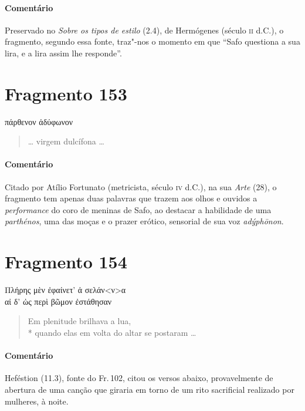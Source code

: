 {\paragraph{Comentário} Preservado no \textit{Sobre os tipos de estilo} (2.4), de Hermógenes (século \textsc{ii} d.C.),
o fragmento, segundo essa fonte, traz"-nos o momento em que ``Safo
questiona a sua lira, e a lira assim lhe responde”.}


\section{Fragmento 153}

\begin{gkverse}
πάρθενον ἀδύφωνον
\end{gkverse}

\begin{verse}
\ldots{} virgem dulcífona \ldots{}
\end{verse}

{\paragraph{Comentário} Citado por Atílio Fortunato (metricista, século \textsc{iv} d.C.), na sua \textit{Arte} (28), o fragmento tem apenas duas palavras que trazem aos olhos e ouvidos a \textit{performance} do coro de meninas de Safo, ao destacar a habilidade de uma \textit{parthénos}, uma das moças e o prazer erótico, sensorial de sua voz \textit{adýphōnon}.}



\section{Fragmento 154}

\begin{gkverse}
Πλήρης μὲν ἐφαίνετ’ ἀ σελάν<ν>α\\
αἰ δ’ ὠς περὶ βῶμον ἐστάθησαν
\end{gkverse}

\begin{verse}
Em plenitude brilhava a lua, \\*
quando elas em volta do altar se postaram \ldots{}
\end{verse}

{\paragraph{Comentário} Heféstion (11.3), fonte do Fr.\,102, citou os versos abaixo, provavelmente de abertura
de uma canção que giraria em torno de um rito sacrificial realizado
por mulheres, à noite.}


